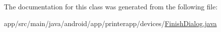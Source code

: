The documentation for this class was generated from the following file\+:\begin{DoxyCompactItemize}
\item 
app/src/main/java/android/app/printerapp/devices/\hyperlink{_finish_dialog_8java}{Finish\+Dialog.\+java}\end{DoxyCompactItemize}
